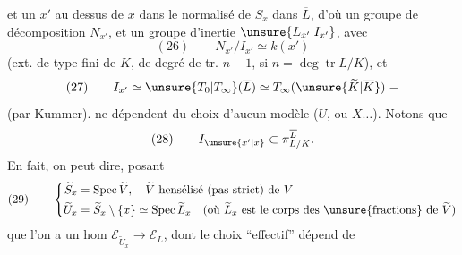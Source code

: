 et un $x'$ au dessus de $x$ dans le normalisé de $S_x$ dans $\overline L$, d'où un groupe de décomposition $N_{x'}$, et un groupe d'inertie $\unsure{L_{x'}|I_{x'}}$, avec
\[
(26)\qquad N_{x'}/I_{x'}\simeq k(x')
\]
(ext. de type fini de $K$, de degré de tr. $n-1$, si $n=\deg\operatorname{tr}L/K$), et
\[
(27)\qquad I_{x'}\simeq\unsure{T_0|T_\infty}(\overline L)\simeq T_\infty(\unsure{\widetilde K|\overline K})\;-
\]
(par Kummer).   ne dépendent du choix d'aucun  modèle ($U$, ou $X\ldots$). Notons que
\[
(28)\qquad I_{\unsure{x'|x}}\subset\pi_{L/K}^{\overline L}.
\]
En fait, on peut dire, posant
\[
(29)\qquad\left\{\begin{aligned}
\widetilde S_x&=\operatorname{Spec}\widetilde V,\quad\widetilde V\text{ hensélisé (pas strict) de }V\\
\widetilde U_x&=\widetilde S_x\setminus\{x\}\simeq\operatorname{Spec}\widetilde L_x\quad(\text{où }\widetilde L_x\text{ est le corps des \unsure{fractions} de }\widetilde V)
\end{aligned}\right.
\]
que l'on a un hom  $\mathcal E_{\widetilde U_x}\longrightarrow\mathcal E_L$,  dont le choix ``effectif'' dépend de

